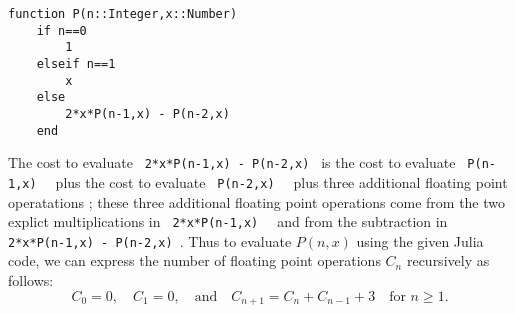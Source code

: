 \documentclass[12pt,fleqn,answers]{exam}
\begin{document}
\begin{questions}
\begin{verbatim}
function P(n::Integer,x::Number)
    if n==0
        1
    elseif n==1 
        x
    else
        2*x*P(n-1,x) - P(n-2,x)
    end
\end{verbatim}

\begin{solution}[3.5in]
The cost to evaluate \verb| 2*x*P(n-1,x) - P(n-2,x) | is the cost 
to evaluate   \verb| P(n-1,x)  | plus the cost to evaluate 
 \verb| P(n-2,x)  | plus three additional floating point operatations ;
 these three additional floating point operations  come from the two explict multiplications in 
 \verb| 2*x*P(n-1,x)  | and from the subtraction in \verb| 2*x*P(n-1,x) - P(n-2,x) |. Thus 
to evaluate $P(n,x)$ using the given Julia code, we can express the number of floating point operations $C_n$ recursively as follows:
\[C_0 = 0, \quad C_1 = 0, \quad \text{and} \quad C_{n+1} = C_n + C_{n-1} + 3 \quad \text{for } n \geq 1.\]
\end{solution}


\end{questions}
\end{document}
